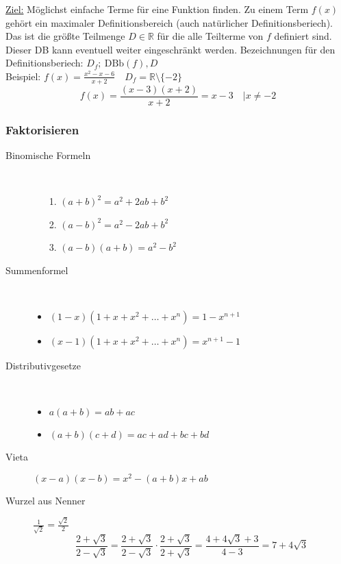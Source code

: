 \documentclass[12pt,a4paper]{article}
\begin{document}
\underline{Ziel:} Möglichst einfache Terme für eine Funktion finden. Zu einem Term $f(x)$ gehört ein maximaler Definitionsbereich (auch natürlicher Definitionsberiech). Das ist die größte Teilmenge $D \in \mathbb{R}$ für die alle Teilterme von $f$ definiert sind. Dieser DB kann eventuell weiter eingeschränkt werden. Bezeichnungen für den Definitionsberiech: $D_f;\ \textrm{DBb}(f), D$ \\

Beispiel: $f(x) = \frac{x^2-x-6}{x+2}\quad D_f=\mathbb{R}\setminus\lbrace-2\rbrace$
$$f(x)= \frac{(x-3)(x+2)}{x+2} = x-3\quad | x \not = -2$$

\subsubsection{Faktorisieren}
\begin{description}
	\item[Binomische Formeln] \
		\begin{itemize}
			\item[1.] $(a+b)^2=a^2+2ab+b^2$
			\item[2.] $(a-b)^2=a^2-2ab+b^2$
			\item[3.] $(a-b)(a+b)=a^2-b^2$
		\end{itemize}
	\item[Summenformel] \
		\begin{itemize}
			\item $(1-x)(1+x+x^2+\dots +x^n)=1-x^{n+1}$
			\item $(x-1)(1+x+x^2+\dots +x^n)=x^{n+1}-1$
		\end{itemize}
	\item[Distributivgesetze] \
		\begin{itemize}
			\item $a(a+b)=ab+ac$
			\item $(a+b)(c+d) = ac +ad + bc +bd$
		\end{itemize}
	\item[Vieta] $(x-a)(x-b) = x^2 - (a+b)x+ab$
	\item[Wurzel aus Nenner] $\frac{1}{\sqrt{2}}=\frac{\sqrt{2}}{2}$
		$$\frac{2+\sqrt{3}}{2-\sqrt{3}}=\frac{2+\sqrt{3}}{2-\sqrt{3}} \cdot \frac{2+\sqrt{3}}{2+\sqrt{3}}=\frac{4+4\sqrt{3}+3}{4-3}=7+4\sqrt{3}$$
\end{description}
\end{document}
